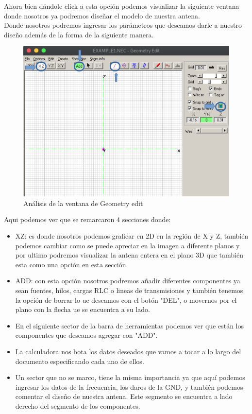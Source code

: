 \documentclass[11pt,a4paper]{article}
\begin{document}
Ahora bien dándole click a esta opción podemos visualizar la siguiente ventana donde nosotros ya podremos diseñar el modelo de nuestra antena.\\
Donde nosotros podremos ingresar los parámetros que deseamos darle a nuestro diseño además de la forma de la siguiente manera.

\begin{figure}[H]
    \centering
    \includegraphics[scale=0.30]{images/4NEC2/geometry2.png}
    \caption{Análisis de la ventana de Geometry edit}
    \label{fig5:edit}
\end{figure}

Aqui podemos ver que se remarcaron 4 secciones donde:

\begin{itemize}
    \item XZ: es donde nosotros podemos graficar en 2D en la región de X y Z, también podemos cambiar como se puede apreciar en la imagen a diferente planos y por ultimo podremos visualizar la antena entera en el plano 3D que también esta como una opción en esta sección.
    \item ADD: con esta opción nosotros podremos añadir diferentes componentes ya sean fuentes, hilos, cargas RLC o lineas de transmisiones y también tenemos la opción de borrar lo ue deseamos con el botón "DEL", o movernos por el plano con la flecha ue se encuentra a su lado.
    \item En el siguiente sector de la barra de herramientas podemos ver que están los componentes que deseamos agregar con "ADD".
    \item La calculadora nos bota los datos deseados que vamos a tocar a lo largo del documento especificando cada uno de ellos.
    \item Un sector que no se marco, tiene la misma importancia ya que aquí podemos ingresar los datos de la frecuencia, los daros de la GND, y también podemos comentar el diseño de nuestra antena. Este segmento se encuentra a lado derecho del segmento de los componentes.
\end{itemize}
\end{document}

